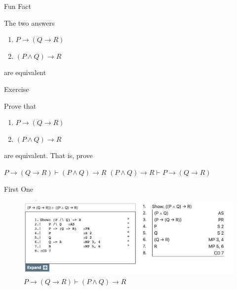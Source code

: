 \documentclass[
  ignorenonframetext,
]{beamer}
\providecommand{\tightlist}{%
  \setlength{\itemsep}{0pt}\setlength{\parskip}{0pt}}
\renewcommand{\,}{\text{, }}
\renewenvironment*{quote}	
	{\list{}{\rightmargin   \leftmargin} \item } 	
	{\endlist }
\begin{document}
\begin{frame}{Fun Fact}
\protect\hypertarget{fun-fact}{}

The two answers

\begin{enumerate}
\tightlist
\item
  \(P \rightarrow (Q \rightarrow R)\)
\item
  \((P \wedge Q) \rightarrow R\)
\end{enumerate}

are equivalent

\end{frame}

\begin{frame}{Exercise}
\protect\hypertarget{exercise}{}

Prove that

\begin{enumerate}
\tightlist
\item
  \(P \rightarrow (Q \rightarrow R)\)
\item
  \((P \wedge Q) \rightarrow R\)
\end{enumerate}

are equivalent. That is, prove

\begin{quote}
\(P \rightarrow (Q \rightarrow R) \vdash (P \wedge Q) \rightarrow R\)
\((P \wedge Q) \rightarrow R \vdash P \rightarrow (Q \rightarrow R)\)
\end{quote}

\end{frame}

\begin{frame}{First One}
\protect\hypertarget{first-one}{}

\begin{figure}
\centering
\includegraphics{../images/class05/Class-05-4.png}
\caption{\(P \rightarrow (Q \rightarrow R) \vdash (P \wedge Q) \rightarrow R\)}
\end{figure}

\end{frame}
\end{document}
